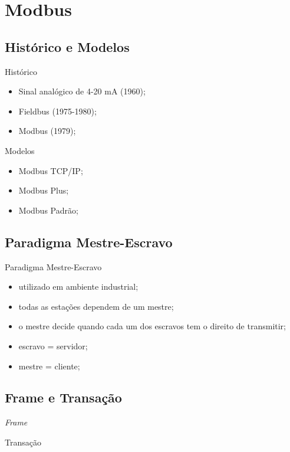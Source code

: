 \renewcommand{\titulo}{Modbus}
\section{\titulo}

\subsection{Histórico e Modelos}
\begin{frame}{Histórico}
\begin{itemize}
\item Sinal analógico de 4-20 mA (1960);
\item Fieldbus (1975-1980);
\item Modbus (1979);
\end{itemize}
\end{frame}

\renewcommand{\titulo}{Modelos}
\begin{frame}{\titulo}
\begin{itemize}
\item Modbus TCP/IP;
\item Modbus Plus;
\item Modbus Padrão;
\end{itemize}
\end{frame}

\renewcommand{\titulo}{Paradigma Mestre-Escravo}
\subsection{\titulo}
\begin{frame}{\titulo}
\begin{itemize}
\item utilizado em ambiente industrial;
\item todas as estações dependem de um mestre;
\item o mestre decide quando cada um dos escravos tem o direito de transmitir;
\item escravo = servidor;
\item mestre = cliente;
\end{itemize}
\end{frame}

\subsection{Frame e Transação}
\begin{frame}{\textit{Frame}}
\end{frame}
\begin{frame}{Transação}
\end{frame}

